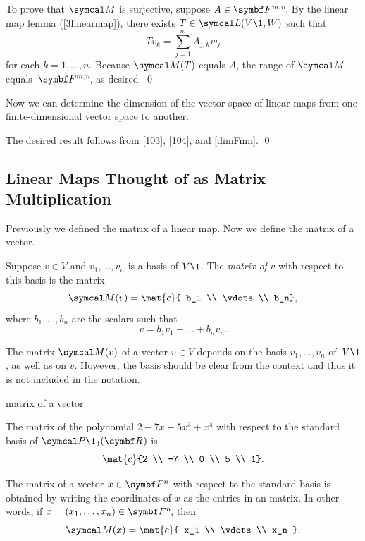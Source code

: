 To prove that $\M$ is surjective, suppose $A \in \FF{m,n}$.  By the linear map lemma (\ref{3linearmap}), there exists $T \in \L(V\1,W)$ such that
\[
Tv_k = \sum_{j=1}^m A_{j,k}w_j
\]
for each $k = 1, \dots, n$. Because $\M(T)$ equals $A$, the range of $\M$ equals~$\FF{m,n}$,  as desired.
\qed

Now we can determine the dimension of the vector space of linear maps from
one finite-dimensional vector space to another.


\proof
The desired result follows from \ref{103}, \ref{104}, and \ref{dimFmn}.
\qed

\subsection{Linear Maps Thought of as Matrix Multiplication}

Previously we defined the matrix of a linear map. Now we define the matrix of a vector.

{Suppose $v \in V$ and $v_1, \dots, v_n$ is a basis of $V\1$. The \emph{matrix of} $v$ with respect to this basis is the  matrix
\[
\M(v) =
\mat{c}{
b_1 \\
\vdots \\
b_n},
\]
where $b_1, \dots, b_n$ are the scalars such that
\[
v = b_1 v_1 + \dots + b_n v_n.
\]
}

The matrix $\M(v)$ of a vector $v \in V$ depends on the basis $v_1, \dots, v_n$ of~$V\1$, as well as on $v$. However, the basis should be clear from the context and thus it is not included in the notation.

\begin{example}{matrix of a vector}
\begin{Itemize}
\item
The matrix of the polynomial $2 - 7x + 5x^3 + x^4$ with respect to the standard basis of $\P\1_4(\R{})$ is
\[
\mat{c}{2 \\ -7 \\ 0 \\ 5 \\ 1}.
\]
\item
The matrix of a vector $x \in \F{n}$ with respect to the standard basis
is obtained by writing the coordinates of $x$ as the  entries in an
 matrix.  In other words, if $x = (x_1, \dots, x_n) \in \FF{n}$, then
\[
\M(x) =
\mat{c}{
x_1 \\
\vdots \\
x_n }.
\]
\end{Itemize}
\vspace{-.05in}
\end{example}

